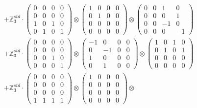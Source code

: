 \documentclass{article}
\begin{document}
{\begin{align}
        &+ \label{Rs1-Rc16-Strassen-1-c4} \mathbb{Z}_3^{std} \cdot 
            \begin{pmatrix} 0 & 0 & 0 & 0 \\ 0 & 0 & 0 & 0 \\ 1 & 0 & 1 & 0 \\ 0 & 1 & 0 & 1 \end{pmatrix} \otimes 
            \begin{pmatrix} 1 & 0 & 0 & 0 \\ 0 & 1 & 0 & 0 \\ 0 & 0 & 0 & 0 \\ 0 & 0 & 0 & 0 \end{pmatrix} \otimes 
            \begin{pmatrix} 0 & 0 & 1 & 0 \\ 0 & 0 & 0 & 1 \\ 0 & 0 & -1 & 0 \\ 0 & 0 & 0 & -1 \end{pmatrix} \\ 
        &+ \label{Rs1-Rc16-Strassen-1-c5} \mathbb{Z}_3^{std} \cdot 
            \begin{pmatrix} 0 & 0 & 0 & 0 \\ 0 & 0 & 0 & 0 \\ 0 & 0 & 1 & 0 \\ 0 & 0 & 0 & 1 \end{pmatrix} \otimes 
            \begin{pmatrix} -1 & 0 & 0 & 0 \\ 0 & -1 & 0 & 0 \\ 1 & 0 & 0 & 0 \\ 0 & 1 & 0 & 0 \end{pmatrix} \otimes 
            \begin{pmatrix} 1 & 0 & 1 & 0 \\ 0 & 1 & 0 & 1 \\ 0 & 0 & 0 & 0 \\ 0 & 0 & 0 & 0 \end{pmatrix} \\ 
        &+ \label{Rs1-Rc16-Strassen-1-c6} \mathbb{Z}_3^{std} \cdot 
            \begin{pmatrix} 0 & 0 & 0 & 0 \\ 0 & 0 & 0 & 0 \\ 0 & 0 & 0 & 0 \\ 1 & 1 & 1 & 1 \end{pmatrix} \otimes 
            \begin{pmatrix} 1 & 0 & 0 & 0 \\ 0 & 0 & 0 & 0 \\ 0 & 0 & 0 & 0 \\ 0 & 0 & 0 & 0 \end{pmatrix} \otimes 

\end{align}}
\end{document}
